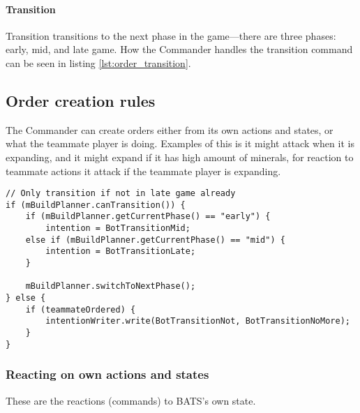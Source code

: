 \paragraph{Transition}
Transition transitions to the next phase in the game—there are three phases: early, mid, and late
game. How the Commander handles the transition command can be seen in listing
\ref{lst:order_transition}.

\subsection{Order creation rules}
The Commander can create orders either from its own actions and states, or what the teammate player is doing. Examples of this is it might attack when it is expanding, and it might expand if it has high amount of minerals, for reaction to teammate actions it attack if the teammate player is expanding.
\clearpage
\begin{lstlisting}[label={lst:order_transition},caption={Pseudo-code for transition command}]
// Only transition if not in late game already
if (mBuildPlanner.canTransition()) {
	if (mBuildPlanner.getCurrentPhase() == "early") {
		intention = BotTransitionMid;
	else if (mBuildPlanner.getCurrentPhase() == "mid") {
		intention = BotTransitionLate;
	}

	mBuildPlanner.switchToNextPhase();
} else {
	if (teammateOrdered) {
		intentionWriter.write(BotTransitionNot, BotTransitionNoMore);
	}
}
\end{lstlisting}

\subsubsection{Reacting on own actions and states}
These are the reactions (commands) to BATS's own state.

